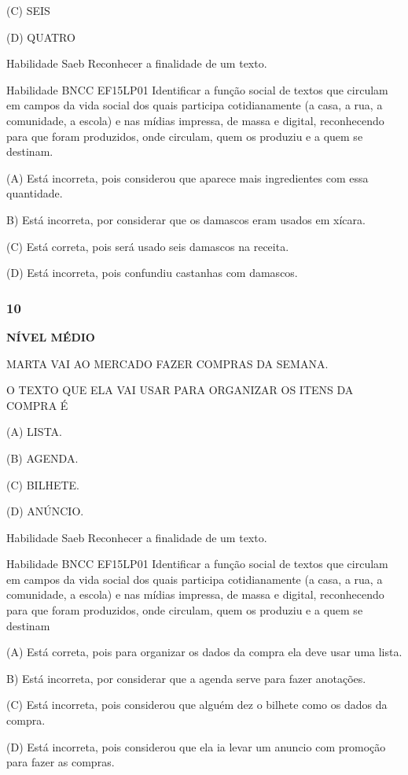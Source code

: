 (C) SEIS

(D) QUATRO

Habilidade Saeb Reconhecer a finalidade de um texto.

Habilidade BNCC EF15LP01 Identificar a função social de textos que
circulam em campos da vida social dos quais participa cotidianamente (a
casa, a rua, a comunidade, a escola) e nas mídias impressa, de massa e
digital, reconhecendo para que foram produzidos, onde circulam, quem os
produziu e a quem se destinam.

(A) Está incorreta, pois considerou que aparece mais ingredientes com
essa quantidade.

B) Está incorreta, por considerar que os damascos eram usados em xícara.

(C) Está correta, pois será usado seis damascos na receita.

(D) Está incorreta, pois confundiu castanhas com damascos.

\subsubsection{10}\label{section-136}

\textbf{NÍVEL MÉDIO}

MARTA VAI AO MERCADO FAZER COMPRAS DA SEMANA.

O TEXTO QUE ELA VAI USAR PARA ORGANIZAR OS ITENS DA COMPRA É

(A) LISTA.

(B) AGENDA.

(C) BILHETE.

(D) ANÚNCIO.

Habilidade Saeb Reconhecer a finalidade de um texto.

Habilidade BNCC EF15LP01 Identificar a função social de textos que
circulam em campos da vida social dos quais participa cotidianamente (a
casa, a rua, a comunidade, a escola) e nas mídias impressa, de massa e
digital, reconhecendo para que foram produzidos, onde circulam, quem os
produziu e a quem se destinam

(A) Está correta, pois para organizar os dados da compra ela deve usar
uma lista.

B) Está incorreta, por considerar que a agenda serve para fazer
anotações.

(C) Está incorreta, pois considerou que alguém dez o bilhete como os
dados da compra.

(D) Está incorreta, pois considerou que ela ia levar um anuncio com
promoção para fazer as compras.

